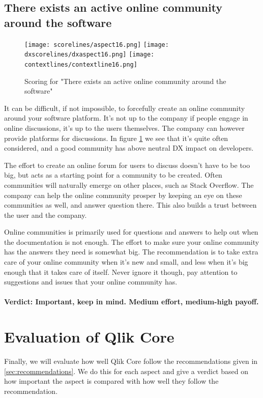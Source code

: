 \documentclass{cslthse-msc}
\begin{document}
    \subsection{There exists an active online community around the software}
    \begin{figure}[H]
        \centering
        \texttt{[image: scorelines/aspect16.png]}
        \texttt{[image: dxscorelines/dxaspect16.png]}
        \texttt{[image: contextlines/contextline16.png]}
        \caption{Scoring for "There exists an active online community around the software"}
        \label{fig:aspect16}
    \end{figure}
    It can be difficult, if not impossible, to forcefully create an online community around your software platform. It's not up to the company if people engage in online discussions, it's up to the users themselves. The company can however provide platforms for discussions. In figure \ref{fig:aspect16} we see that it's quite often considered, and a good community has above neutral DX impact on developers.

    The effort to create an online forum for users to discuss doesn't have to be too big, but acts as a starting point for a community to be created. Often communities will naturally emerge on other places, such as Stack Overflow. The company can help the online community prosper by keeping an eye on these communities as well, and answer question there. This also builds a trust between the user and the company.

    Online communities is primarily used for questions and answers to help out when the documentation is not enough. The effort to make sure your online community has the answers they need is somewhat big. The recommendation is to take extra care of your online community when it's new and small, and less when it's big enough that it takes care of itself. Never ignore it though, pay attention to suggestions and issues that your online community has. \\ \\
    \textbf{Verdict: Important, keep in mind. Medium effort, medium-high payoff.}
    \section{Evaluation of Qlik Core}
    Finally, we will evaluate how well Qlik Core follow the recommendations given in \ref{sec:recommendations}. We do this for each aspect and give a verdict based on how important the aspect is compared with how well they follow the recommendation.
\end{document}
